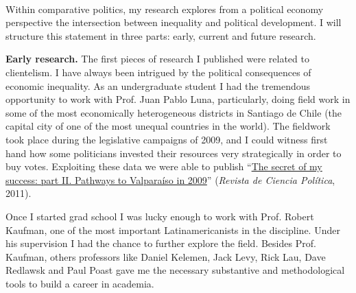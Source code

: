 \documentclass[10pt,stdletter,dateno,sigleft]{newlfm} %
\begin{document}
\begin{newlfm}




\vspace{-2cm}{\bf \huge Research Statement}\\

Within comparative politics, my research explores from a political economy perspective the intersection between inequality and political development. I will structure this statement in three parts: early, current and future research.

{\bf Early research.} The first pieces of research I published were related to clientelism. I have always been intrigued by the political consequences of economic inequality. As an undergraduate student I had the tremendous opportunity to work with Prof. Juan Pablo Luna, particularly, doing field work in some of the most economically heterogeneous districts in Santiago de Chile (the capital city of one of the most unequal countries in the world). The fieldwork took place during the legislative campaigns of 2009, and I could witness first hand how some politicians invested their resources very strategically in order to buy votes. Exploiting these data we were able to publish ``\href{https://scielo.conicyt.cl/pdf/revcipol/v31n2/art07.pdf}{The secret of my success: part II. Pathways to Valpara\'iso in 2009}'' (\emph{Revista de Ciencia Pol\'itica}, 2011). 

Once I started grad school I was lucky enough to work with Prof. Robert Kaufman, one of the most important Latinamericanists in the discipline. Under his supervision I had the chance to further explore the field. Besides Prof. Kaufman, others professors like Daniel Kelemen, Jack Levy, Rick Lau, Dave Redlawsk and Paul Poast gave me the necessary substantive and methodological tools to build a career in academia.


\end{newlfm}
\end{document}
